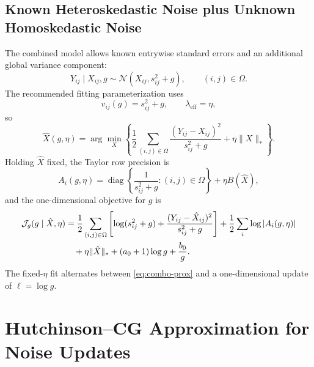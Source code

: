 \documentclass[11pt]{article}
\begin{document}
\subsection{Known Heteroskedastic Noise plus Unknown Homoskedastic Noise}

The combined model allows known entrywise standard errors and an additional
global variance component:
\begin{equation}
    Y_{ij}\mid X_{ij},g
    \sim
    \mathcal{N}(X_{ij},s_{ij}^2+g),
    \qquad (i,j)\in\Omega.
\end{equation}
The recommended fitting parameterization uses
\begin{equation}
    v_{ij}(g)=s_{ij}^2+g,
    \qquad
    \lambda_{\mathrm{eff}}=\eta,
\end{equation}
so
\begin{equation}
    \hat X(g,\eta)
    =
    \arg\min_X
    \left\{
        \frac{1}{2}
        \sum_{(i,j)\in\Omega}
        \frac{(Y_{ij}-X_{ij})^2}{s_{ij}^2+g}
        +
        \eta\|X\|_*
    \right\}.
    \label{eq:combo-prox}
\end{equation}
Holding $\hat X$ fixed, the Taylor row precision is
\begin{equation}
    A_i(g,\eta)
    =
    \operatorname{diag}
    \left\{
        \frac{1}{s_{ij}^2+g}:(i,j)\in\Omega
    \right\}
    +
    \eta B(\hat X),
\end{equation}
and the one-dimensional objective for $g$ is
\begin{align}
    \mathcal{J}_g(g\mid \hat X,\eta)
    &=
    \frac{1}{2}
    \sum_{(i,j)\in\Omega}
    \left[
        \log(s_{ij}^2+g)
        +
        \frac{(Y_{ij}-\hat X_{ij})^2}{s_{ij}^2+g}
    \right]
    +
    \frac{1}{2}\sum_i\log|A_i(g,\eta)| \notag\\
    &\quad
    +
    \eta\|\hat X\|_*
    +
    (a_0+1)\log g
    +
    \frac{b_0}{g}.
    \label{eq:combo-g-objective}
\end{align}
The fixed-$\eta$ fit alternates between \eqref{eq:combo-prox} and a
one-dimensional update of $\ell=\log g$.

\section{Hutchinson--CG Approximation for Noise Updates}
\end{document}
